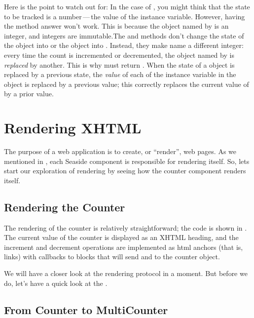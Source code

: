 \documentclass[a4paper,10pt,twoside]{book}
\begin{document}
Here is the point to watch out for:
In the case of , you might think that the state to be tracked is a
number\,---\,the value of the  instance variable.
However, having the  method answer  won't work.  
This is because the object named by  is an integer, and integers are
immutable.The  and  methods don't change the state of the
object 
into  or the object  into .
Instead, they make  name a different integer: 
every time the count is incremented or decremented, the object named by  is
\emph{replaced} by another.
This is why  must return .
When the state of a \mbox{} object is replaced by a previous state, the
\emph{value} of each of the instance variable in the object is replaced by a previous
value; this correctly replaces the current value of  by a prior value.

\section{Rendering XHTML}

The purpose of a web application is to create, or ``render'', web pages. As we mentioned
in , each Seaside component is responsible for rendering itself.
So, lets start our exploration of rendering by seeing how the counter component renders
itself.

\subsection{Rendering the Counter}

The rendering of the counter is relatively straightforward; the code is shown in
.
The current value of the counter is displayed as an XHTML heading, and the increment and
decrement operations are implemented as html anchors (that is, links) with callbacks to
blocks that will send  and  to the counter object.

We will have a closer look at the rendering protocol in a moment.
But before we do, let's have a quick look at the .

\subsection{From Counter to MultiCounter}
\end{document}
